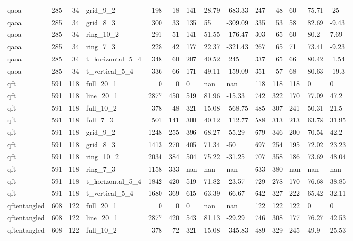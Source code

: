 \begin{longtable}{lrrlrrlllrrlll}
qaoa & 285 & 34 & grid\_9\_2 & 198 & 18 & 141 & 28.79 & -683.33 & 247 & 48 & 60 & 75.71 & -25 \\
qaoa & 285 & 34 & grid\_8\_3 & 300 & 33 & 135 & 55 & -309.09 & 335 & 53 & 58 & 82.69 & -9.43 \\
qaoa & 285 & 34 & ring\_10\_2 & 291 & 51 & 141 & 51.55 & -176.47 & 303 & 65 & 60 & 80.2 & 7.69 \\
qaoa & 285 & 34 & ring\_7\_3 & 228 & 42 & 177 & 22.37 & -321.43 & 267 & 65 & 71 & 73.41 & -9.23 \\
qaoa & 285 & 34 & t\_horizontal\_5\_4 & 348 & 60 & 207 & 40.52 & -245 & 337 & 65 & 66 & 80.42 & -1.54 \\
qaoa & 285 & 34 & t\_vertical\_5\_4 & 336 & 66 & 171 & 49.11 & -159.09 & 351 & 57 & 68 & 80.63 & -19.3 \\
qft & 591 & 118 & full\_20\_1 & 0 & 0 & 0 & nan & nan & 118 & 118 & 118 & 0 & 0 \\
qft & 591 & 118 & line\_20\_1 & 2877 & 450 & 519 & 81.96 & -15.33 & 742 & 322 & 170 & 77.09 & 47.2 \\
qft & 591 & 118 & full\_10\_2 & 378 & 48 & 321 & 15.08 & -568.75 & 485 & 307 & 241 & 50.31 & 21.5 \\
qft & 591 & 118 & full\_7\_3 & 501 & 141 & 300 & 40.12 & -112.77 & 588 & 313 & 213 & 63.78 & 31.95 \\
qft & 591 & 118 & grid\_9\_2 & 1248 & 255 & 396 & 68.27 & -55.29 & 679 & 346 & 200 & 70.54 & 42.2 \\
qft & 591 & 118 & grid\_8\_3 & 1413 & 270 & 405 & 71.34 & -50 & 697 & 254 & 195 & 72.02 & 23.23 \\
qft & 591 & 118 & ring\_10\_2 & 2034 & 384 & 504 & 75.22 & -31.25 & 707 & 358 & 186 & 73.69 & 48.04 \\
qft & 591 & 118 & ring\_7\_3 & 1158 & 333 & nan & nan & nan & 633 & 380 & nan & nan & nan \\
qft & 591 & 118 & t\_horizontal\_5\_4 & 1842 & 420 & 519 & 71.82 & -23.57 & 729 & 278 & 170 & 76.68 & 38.85 \\
qft & 591 & 118 & t\_vertical\_5\_4 & 1680 & 369 & 615 & 63.39 & -66.67 & 642 & 327 & 222 & 65.42 & 32.11 \\
qftentangled & 608 & 122 & full\_20\_1 & 0 & 0 & 0 & nan & nan & 122 & 122 & 122 & 0 & 0 \\
qftentangled & 608 & 122 & line\_20\_1 & 2877 & 420 & 543 & 81.13 & -29.29 & 746 & 308 & 177 & 76.27 & 42.53 \\
qftentangled & 608 & 122 & full\_10\_2 & 378 & 72 & 321 & 15.08 & -345.83 & 489 & 329 & 245 & 49.9 & 25.53 \\

\end{longtable}
